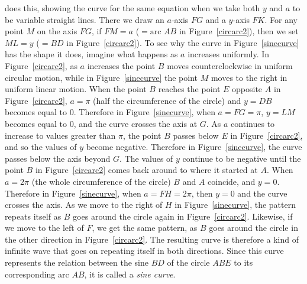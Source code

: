 \documentclass[polutonikogreek,english,twoside,openright]{article}
\begin{document}
 does this, showing the curve for the same equation when we take both $y$ and $a$ to be variable straight lines.  There we draw an $a$-axis $FG$ and a $y$-axis $FK$.  For any point $M$ on the axis $FG$, if $FM= a$ ($=\mbox{arc }AB$ in Figure~\ref{circarc2}), then we set $ML=y$ ($=BD$ in Figure~\ref{circarc2}). To see why the curve in Figure~\ref{sinecurve} has the shape it does, imagine what happens as $a$ increases uniformly.  In Figure~\ref{circarc2}, as $a$ increases the point $B$ moves counterclockwise in uniform circular motion, while in Figure~\ref{sinecurve} the point $M$ moves to the right in uniform linear motion.   When the point $B$ reaches the point $E$ opposite $A$ in Figure~\ref{circarc2}, $a= \pi$ (half the circumference of the circle) and $y = DB$ becomes equal to 0.  Therefore in Figure~\ref{sinecurve}, when $a = FG = \pi$, $y=LM$ becomes equal to 0, and the curve crosses the axis at $G$.  As $a$ continues to increase to values greater than $\pi$, the point $B$ passes below $E$ in Figure~\ref{circarc2}, and so the values of $y$ become negative.  Therefore in Figure~\ref{sinecurve}, the curve passes below the axis beyond $G$.  The values of $y$ continue to be negative until the point $B$ in Figure~\ref{circarc2} comes back around to where it started at $A$.  When $a= 2\pi$ (the whole circumference of the circle) $B$ and $A$ coincide, and $y=0$. Therefore in Figure~\ref{sinecurve}, when $a = FH = 2\pi$,  then $y=0$ and the curve crosses the axis.   As we move to the right of $H$ in Figure~\ref{sinecurve}, the pattern repeats itself as $B$ goes around the circle again in Figure~\ref{circarc2}.  Likewise, if we move to the left of $F$, we get the same pattern, as $B$ goes around the circle in the other direction in Figure~\ref{circarc2}.  The resulting curve is therefore a kind of infinite wave that goes on repeating itself in both directions.  Since this curve represents the relation between the sine $BD$ of the circle $ABE$ to its corresponding arc $AB$, it is called a {\em sine curve}.\label{endsin}
 
\end{document}

